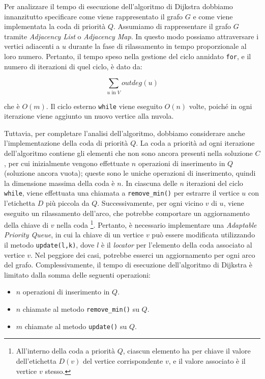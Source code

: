 Per analizzare il tempo di esecuzione dell'algoritmo di Dijkstra dobbiamo innanzitutto specificare come viene rappresentato il grafo $G$ e come viene implementata la coda di priorità $Q$. Assumiamo di rappresentare il grafo $G$ tramite \emph{Adjacency List} o \emph{Adjacency Map}. In questo modo possiamo attraversare i vertici adiacenti a $u$ durante la fase di rilassamento in tempo proporzionale al loro numero. Pertanto, il tempo speso nella gestione del ciclo annidato \texttt{for}, e il numero di iterazioni di quel ciclo, è dato da:

$$
\sum_{u \text{ in } V} outdeg(u)
$$

\noindent
che è $O(m)$. Il ciclo esterno \texttt{while} viene eseguito $O(n)$ volte, poiché in ogni iterazione viene aggiunto un nuovo vertice alla nuvola. 

Tuttavia, per completare l'analisi dell'algoritmo, dobbiamo considerare anche l'implementazione della coda di priorità $Q$. La coda a priorità ad ogni iterazione dell'algoritmo contiene gli elementi che non sono ancora presenti nella soluzione $C$, per cui inizialmente vengono effettuate $n$ operazioni di inserimento in $Q$ (soluzione ancora vuota); queste sono le uniche operazioni di inserimento, quindi la dimensione massima della coda è $n$. In ciascuna delle $n$ iterazioni del ciclo \texttt{while}, viene effettuata una chiamata a \texttt{remove\_min()} per estrarre il vertice $u$ con l'etichetta $D$ più piccola da $Q$. Successivamente, per ogni vicino $v$ di $u$, viene eseguito un rilassamento dell'arco, che potrebbe comportare un aggiornamento della chiave di $v$ nella coda \footnote
{
    All'interno della coda a priorità $Q$, ciascun elemento ha per chiave il valore dell'etichetta $D(v)$ del vertice corrispondente $v$, e il valore associato è il vertice $v$ stesso. 
}. Pertanto, è necessario implementare una \emph{Adaptable Priority Queue}, in cui la chiave di un vertice $v$ può essere modificata utilizzando il metodo \texttt{update(l,k)}, dove $l$ è il \emph{locator} per l'elemento della coda associato al vertice $v$. Nel peggiore dei casi, potrebbe esserci un aggiornamento per ogni arco del grafo. Complessivamente, il tempo di esecuzione dell'algoritmo di Dijkstra è limitato dalla somma delle seguenti operazioni:
\begin{itemize}[nosep]
    \item $n$ operazioni di inserimento in $Q$.
    \item $n$ chiamate al metodo \texttt{remove\_min()} su $Q$.
    \item $m$ chiamate al metodo \texttt{update()} su $Q$.
\end{itemize}

